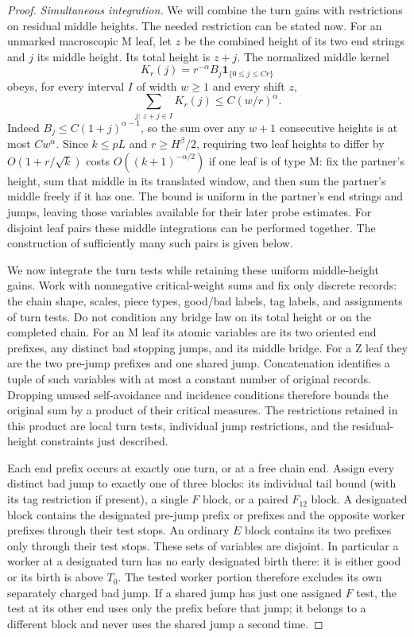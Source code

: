 \begin{proof}
\smallskip\noindent\emph{Simultaneous integration.}
We will combine the turn gains with restrictions on residual middle
heights. The needed restriction can be stated now. For an unmarked
macroscopic $\mathrm M$ leaf, let $z$ be the combined height of its two
end strings and $j$ its middle height. Its total height is $z+j$.
The normalized middle kernel
\[
 K_r(j)=r^{-\alpha}B_j\mathbf1_{\{0\le j\le Cr\}}
\]
obeys, for every interval $I$ of width $w\ge1$ and every shift $z$,
\begin{equation}
 \sum_{j:\,z+j\in I}K_r(j)\le C(w/r)^\alpha.
 \label{eq:11-middle-window}
\end{equation}
Indeed $B_j\le C(1+j)^{\alpha-1}$, so the sum over any $w+1$
consecutive heights is at most $Cw^\alpha$. Since $k\le pL$ and
$r\ge H^\beta/2$, requiring
two leaf heights to differ by $O(1+r/\sqrt{k})$ costs
$O((k+1)^{-\alpha/2})$ if one leaf is of type $\mathrm M$: fix the
partner's height, sum that middle in its translated window, and then
sum the partner's middle freely if it has one. The bound is uniform
in the partner's end strings and jumps, leaving those variables
available for their later probe estimates. For disjoint leaf pairs
these middle integrations can be performed together.
The construction of sufficiently many such pairs is given below.

We now integrate the turn tests while retaining these uniform
middle-height gains. Work with nonnegative critical-weight sums and
fix only discrete records: the chain shape, scales, piece types,
good/bad labels, tag labels, and assignments of turn tests. Do not
condition any bridge law on its total height or on the completed
chain. For an $\mathrm M$ leaf its atomic variables are its two
oriented end prefixes, any distinct bad stopping jumps, and its
middle bridge. For a $\mathrm Z$ leaf they are the two pre-jump
prefixes and one shared jump. Concatenation identifies a tuple of
such variables with at most a constant number of original records.
Dropping unused self-avoidance and incidence conditions therefore
bounds the original sum by a product of their critical measures.
The restrictions retained in this product are local turn tests,
individual jump restrictions, and the residual-height constraints
just described.

Each end prefix occurs at exactly one turn, or at a free chain end.
Assign every distinct bad jump to exactly one of three blocks: its
individual tail bound (with its tag restriction if present), a
single $F$ block, or a paired $F_{12}$ block. A designated block
contains the designated pre-jump prefix or prefixes and the opposite
worker prefixes through their test stops. An ordinary $E$ block
contains its two prefixes only through their test stops. These sets
of variables are disjoint. In particular a worker at a designated
turn has no early designated birth there: it is either good or its
birth is above $T_0$. The tested worker portion therefore excludes
its own separately charged bad jump. If a shared jump has just one
assigned $F$ test, the test at its other end uses only the prefix
before that jump; it belongs to a different block and never uses
the shared jump a second time.


\end{proof}
